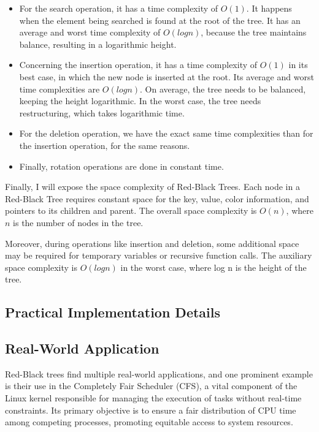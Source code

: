 \documentclass[12pt]{amsart}
\begin{document}
    \begin{itemize}
    	\item For the search operation, it has a time complexity
            of $O(1)$. It happens when the element being
            searched is found at the root of the tree. It has an
            average and worst time complexity of $O(log n)$,
            because the tree maintains balance, resulting in a
            logarithmic height.
    	
    	\item Concerning the insertion operation, it has a time
            complexity of $O(1)$ in its best case, in which the
            new node is inserted at the root. Its average and
            worst time complexities are $O(log n)$. On average,
            the tree needs to be balanced, keeping the height
            logarithmic. In the worst case, the tree needs
            restructuring, which takes logarithmic time.
    	
    	\item For the deletion operation, we have the exact same
            time complexities than for the insertion operation,
            for the same reasons.
    	
    	\item Finally, rotation operations are done in constant
            time.
    \end{itemize}
    
    Finally, I will expose the space complexity of Red-Black
    Trees. Each node in a Red-Black Tree requires constant space
    for the key, value, color information, and pointers to its
    children and parent. The overall space complexity is $O(n)$,
    where $n$ is the number of nodes in the tree.
    
    Moreover, during operations like insertion and deletion,
    some additional space may be required for temporary
    variables or recursive function calls. The auxiliary space
    complexity is $O(log n)$ in the worst case, where log n is
    the height of the tree.

\subsection{Practical Implementation Details}


\subsection{Real-World Application}
   Red-Black trees find multiple real-world applications, and
   one prominent example is their use in the Completely Fair
   Scheduler (CFS), a vital component of the Linux kernel
   responsible for managing the execution of tasks without
   real-time constraints. Its primary objective is to ensure a
   fair distribution of CPU time among competing processes,
   promoting equitable access to system resources.
   
\end{document}
